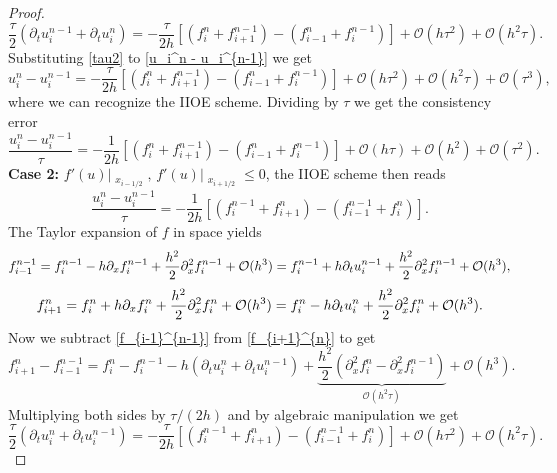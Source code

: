 \documentclass[../include.tex]{subfiles}
\begin{document}
\begin{proof}
\begin{equation}
	\frac{\tau}{2}\left(\partial_t u_i^{n-1} + \partial_t u_i^{n}\right) = - \frac{\tau}{2h}\left[(f_i^n + f_{i+1}^{n-1}) - (f_{i-1}^n + f_i^{n-1})\right] + \mathcal{O}(h\tau^2) + \mathcal{O}(h^2\tau).
	\label{tau2}
\end{equation}
Substituting \eqref{tau2} to \eqref{u_i^n - u_i^{n-1}} we get
\[	u_i^n - u_i^{n-1} = - \frac{\tau}{2h}\left[(f_i^n + f_{i+1}^{n-1}) - (f_{i-1}^n + f_i^{n-1})\right] + \mathcal{O}(h\tau^2) + \mathcal{O}(h^2\tau) + \mathcal{O}(\tau^3),\]
where we can recognize the IIOE scheme. Dividing by $ \tau $ we get the consistency error
\begin{equation}
	\frac{u_i^n - u_i^{n-1}}{\tau} = - \frac{1}{2h}\left[(f_i^n + f_{i+1}^{n-1}) - (f_{i-1}^n + f_i^{n-1})\right] + \mathcal{O}(h\tau) + \mathcal{O}(h^2) + \mathcal{O}(\tau^2).
\end{equation}
\textbf{Case 2: }$ f'(u)\big|_{\substack{x_{i-1/2}}},\,f'(u)\big|_{\substack{x_{i+1/2}}} \leq 0 $, the IIOE scheme then reads
\[
\frac{u_i^{n} - u_i^{n - 1}}{\tau} = - \frac{1}{2h}\left[(f_i^{n-1} + f_{i+1}^{n}) - (f_{i-1}^{n-1} + f_i^{n})\right].
\]
The Taylor expansion of $ f $ in space yields
\begin{equation}
	f_{i-1}^{n-1} = f_{i}^{n-1} - h\partial_x f_{i}^{n-1} + \frac{h^2}{2}\partial_x^2 f_{i}^{n-1} + \mathcal{O}(h^3) = f_{i}^{n-1} + h\partial_t u_{i}^{n-1} + \frac{h^2}{2}\partial_x^2 f_i^{n-1} + \mathcal{O}(h^3),
	\label{f_{i-1}^{n-1}}
\end{equation}
\begin{equation}
	f_{i+1}^{n} = f_i^{n} + h \partial_x f_i^{n} + \frac{h^2}{2} \partial_x^2 f_i^{n} + \mathcal{O}(h^3) = 
	f_i^{n} - h \partial_t u_i^{n} + \frac{h^2}{2} \partial_x^2 f_i^{n} + \mathcal{O}(h^3).
	\label{f_{i+1}^{n}}
\end{equation}
Now we subtract \eqref{f_{i-1}^{n-1}} from \eqref{f_{i+1}^{n}} to get
\[
f_{i+1}^{n} - f_{i-1}^{n-1} = f_i^{n} - f_{i}^{n-1} - h(\partial_t u_i^{n} + \partial_t u_{i}^{n-1}) + \underbrace{\frac{h^2}{2} \left(\partial_x^2 f_i^{n} - \partial_x^2 f_i^{n-1}\right)}_{\mathcal{O}(h^2\tau)} + \mathcal{O}(h^3).
\]
Multiplying both sides by $ \tau/(2h) $ and by algebraic manipulation we get
\begin{equation}
	\frac{\tau}{2}\left(\partial_t u_i^{n} + \partial_t u_i^{n-1}\right) = - \frac{\tau}{2h}\left[(f_i^{n-1} + f_{i+1}^{n}) - (f_{i-1}^{n-1} + f_i^{n})\right] + \mathcal{O}(h\tau^2) + \mathcal{O}(h^2\tau).
	\label{tau2_1}
\end{equation}

\end{proof}
\end{document}
